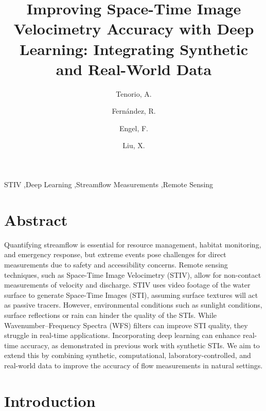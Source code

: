 \documentclass[12pt]{elsarticle}
\begin{document}
\begin{frontmatter}


\title{Improving Space-Time Image Velocimetry Accuracy with Deep Learning: Integrating Synthetic and Real-World Data}

\author[inst1]{Tenorio, A.}
\author[inst1]{Fernández, R.}
\author[inst2]{Engel, F.}
\author[inst1]{Liu, X.}



\begin{keyword}
STIV \sep Deep Learning \sep Streamflow Measurements \sep Remote Sensing
\end{keyword}

\end{frontmatter}

\linenumbers
\section*{Abstract}
Quantifying streamflow is essential for resource management, habitat monitoring, and emergency response, but extreme events pose challenges for direct measurements due to safety and accessibility concerns. Remote sensing techniques, such as Space-Time Image Velocimetry (STIV), allow for non-contact measurements of velocity and discharge. STIV uses video footage of the water surface to generate Space-Time Images (STI), assuming surface textures will act as passive tracers. However, environmental conditions such as sunlight conditions, surface reflections or rain can hinder the quality of the STIs. While Wavenumber–Frequency Spectra (WFS) filters can improve STI quality, they struggle in real-time applications. Incorporating deep learning can enhance real-time accuracy, as demonstrated in previous work with synthetic STIs. We aim to extend this by combining synthetic, computational, laboratory-controlled, and real-world data to improve the accuracy of flow measurements in natural settings.
\section{Introduction}
\end{document}
